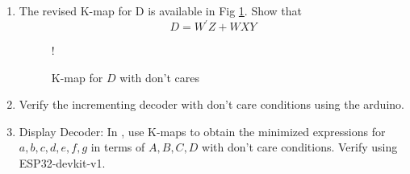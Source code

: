 \begin{enumerate}[label=\arabic*.,ref=\theenumi]
%
\item  The revised K-map for D is available in Fig \ref{fig:kmap_D_x}.  Show that 
%
\begin{equation}
D  = {W}^{\prime}{Z} + {W}{X}{Y}
\end{equation}
\begin{figure}[H]
	\centering
\resizebox {0.5\columnwidth} {!} {

}
\caption{K-map for $D$ with don't cares}
\label{fig:kmap_D_x}
\end{figure}
%
\item 
	Verify the incrementing decoder with don't care conditions using the arduino.
\item {Display Decoder:}
In ,
use K-maps to obtain the minimized expressions for $a,b,c,d,e,f,g$ in terms of $A,B,C,D$ with  don't care conditions.  Verify using ESP32-devkit-v1.
\end{enumerate}




